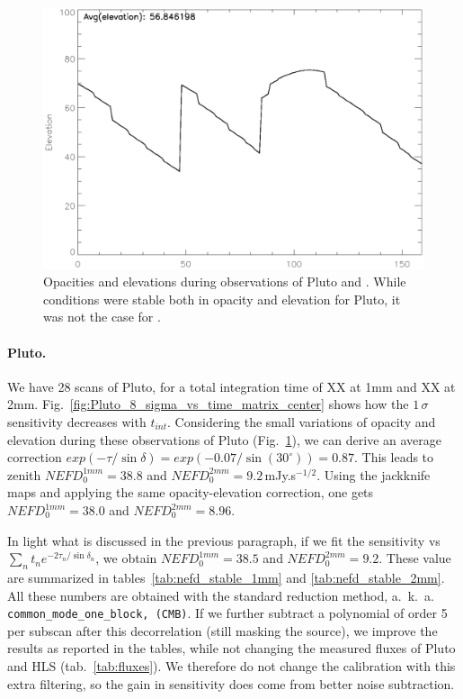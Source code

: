 \begin{figure}[htpb]
\begin{center}
\includegraphics[clip, angle=0, scale=0.4]{Figures/HLS091828_5_elevation.eps}
\caption{Opacities and elevations during observations of Pluto and \hls. While
  conditions were stable both in opacity and elevation for Pluto, it was not the
case for \hls.}
\label{fig:pluto_opacities}
\end{center}
\end{figure}

\paragraph{Pluto.} We have 28 scans of Pluto, for a total
integration time of XX at 1mm and XX at
2mm. Fig.~\ref{fig:Pluto_8_sigma_vs_time_matrix_center} shows how the
$1\,\sigma$ sensitivity decreases with $t_{int}$. Considering the small
variations of opacity and elevation during these observations of Pluto
(Fig.~\ref{fig:pluto_opacities}), we can derive an average correction
$exp(-\tau/\sin\delta) = exp(-0.07/\sin(30^\circ)) = 0.87$. This leads to zenith
$NEFD_0^{1mm} = 38.8$ and $NEFD_0^{2mm} = 9.2$\,mJy.s$^{-1/2}$. Using the
jackknife maps and applying the same opacity-elevation correction, one gets
$NEFD_0^{1mm}=38.0$ and $NEFD_0^{2mm}=8.96$.

In light what is discussed in the previous paragraph, if we fit the sensitivity
vs $\sum_{n}t_n e^{-2\tau_n/\sin\delta_n}$, we obtain $NEFD_0^{1mm} = 38.5$ and
$NEFD_0^{2mm}=9.2$. These value are summarized in
tables~\ref{tab:nefd_stable_1mm} and \ref{tab:nefd_stable_2mm}. All these
numbers are obtained with the standard reduction method, a.~k.~a. {\tt
  common\_mode\_one\_block, (CMB)}. If we further subtract a polynomial of order
5 per subscan after this decorrelation (still masking the source), we improve
the results as reported in the tables, while not changing the measured fluxes of
Pluto and HLS (tab.~\ref{tab:fluxes}). We therefore do not change the
calibration with this extra filtering, so the gain in sensitivity does come from
better noise subtraction.

